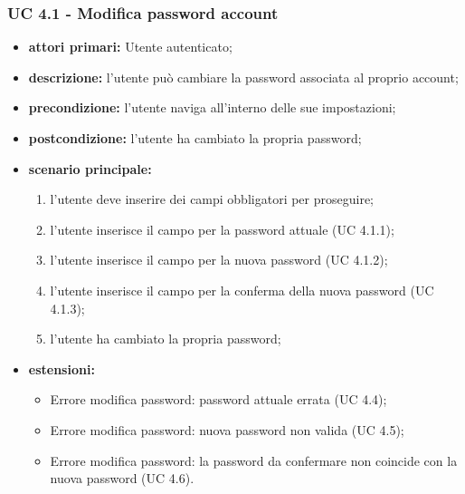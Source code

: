 			\subsubsection{UC 4.1 - Modifica password account}
			\begin{itemize}
				\item \textbf{attori primari:} Utente autenticato;
				\item \textbf{descrizione:} l'utente può cambiare la password associata al proprio account;
				\item \textbf{precondizione:} l'utente naviga all'interno delle sue impostazioni;
				\item \textbf{postcondizione:} l'utente ha cambiato la propria password;
				\item \textbf{scenario principale:}
				\begin{enumerate}
					\item l'utente deve inserire dei campi obbligatori per proseguire;
					\item l'utente inserisce il campo per la password attuale (UC 4.1.1);
					\item l'utente inserisce il campo per la nuova password (UC 4.1.2);
					\item l'utente inserisce il campo per la conferma della nuova password (UC 4.1.3);
					\item l'utente ha cambiato la propria password;
				\end{enumerate}	
				\item \textbf{estensioni:}
					\begin{itemize}
						\item Errore modifica password: password attuale errata (UC 4.4);
						\item Errore modifica password: nuova password non valida (UC 4.5);
						\item Errore modifica password: la password da confermare non coincide con la nuova password (UC 4.6).
					\end{itemize}
			\end{itemize}

